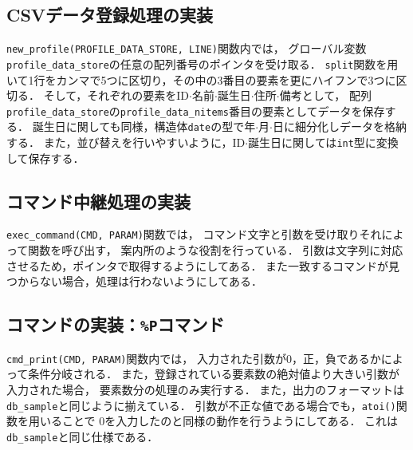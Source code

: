 \documentclass[autodetect-engine,dvi=dvipdfmx,ja=standard,
               a4j,11pt]{bxjsarticle}
\begin{document}
\subsection{CSVデータ登録処理の実装}

\verb|new_profile(PROFILE_DATA_STORE, LINE)|関数内では，
グローバル変数\verb|profile_data_store|の任意の配列番号のポインタを受け取る．
\verb|split|関数を用いて1行をカンマで5つに区切り，その中の3番目の要素を更にハイフンで3つに区切る．
そして，それぞれの要素をID$\cdot$名前$\cdot$誕生日$\cdot$住所$\cdot$備考として，
配列\verb|profile_data_store|の\verb|profile_data_nitems|番目の要素としてデータを保存する．
誕生日に関しても同様，構造体\verb|date|の型で年$\cdot$月$\cdot$日に細分化しデータを格納する．
また，並び替えを行いやすいように，ID$\cdot$誕生日に関しては\verb|int|型に変換して保存する．

\subsection{コマンド中継処理の実装}

\verb|exec_command(CMD, PARAM)|関数では，
コマンド文字と引数を受け取りそれによって関数を呼び出す，
案内所のような役割を行っている．
引数は文字列に対応させるため，ポインタで取得するようにしてある．
また一致するコマンドが見つからない場合，処理は行わないようにしてある．

\subsection{コマンドの実装：\texttt{\%P}コマンド}

\verb|cmd_print(CMD, PARAM)|関数内では，
入力された引数が0，正，負であるかによって条件分岐される．
また，登録されている要素数の絶対値より大きい引数が入力された場合，
要素数分の処理のみ実行する．
また，出力のフォーマットは\verb|db_sample|と同じように揃えている．
引数が不正な値である場合でも，\verb|atoi()|関数を用いることで
$0$を入力したのと同様の動作を行うようにしてある．
これは\verb|db_sample|と同じ仕様である．

\end{document}
